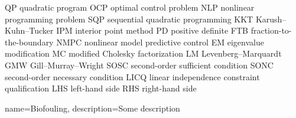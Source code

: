     {QP}    {quadratic program}
   {OCP}   {optimal control problem}
   {NLP}   {nonlinear programming problem}
   {SQP}   {sequential quadratic programming}
   {KKT}   {Karush--Kuhn--Tucker}
   {IPM}   {interior point method}
    {PD}    {positive definite}
   {FTB}   {fraction-to-the-boundary}
  {NMPC}  {nonlinear model predictive control}
    {EM}    {eigenvalue modification}
    {MC}    {modified Cholesky factorization}
    {LM}    {Levenberg--Marquardt}
   {GMW}   {Gill--Murray--Wright}
  {SOSC}  {second-order sufficient condition}
  {SONC}  {second-order necessary condition}
  {LICQ}  {linear independence constraint qualification}
   {LHS}   {left-hand side}
   {RHS}   {right-hand side}


     {
        name=Biofouling,
        description={Some description}}
    
